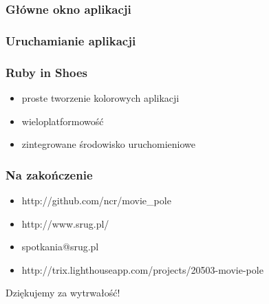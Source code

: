 \documentclass[12t]{beamer}
\begin{document}
\begin{frame}[fragile]
  \frametitle{Główne okno aplikacji}
  \begin{tiny}
    
  \end{tiny}
\end{frame}

\begin{frame}[fragile]
  \frametitle{Uruchamianie aplikacji}
  \begin{small}
    
  \end{small}
\end{frame}

\begin{frame}[fragile]
  \frametitle{Ruby in Shoes}
  \begin{itemize}
  \item proste tworzenie kolorowych aplikacji
  \item wieloplatformowość
  \item zintegrowane środowisko uruchomieniowe
  \end{itemize}
\end{frame}

\begin{frame}
  \frametitle{Na zakończenie}
  \begin{itemize}
  \item http://github.com/ncr/movie\_pole
  \item http://www.srug.pl/
  \item spotkania@srug.pl
  \item http://trix.lighthouseapp.com/projects/20503-movie-pole
  \end{itemize}
\end{frame}

\begin{frame}
  \begin{center}
    \begin{Large}
      Dziękujemy za wytrwałość!
    \end{Large}
  \end{center}
\end{frame}
\end{document}
